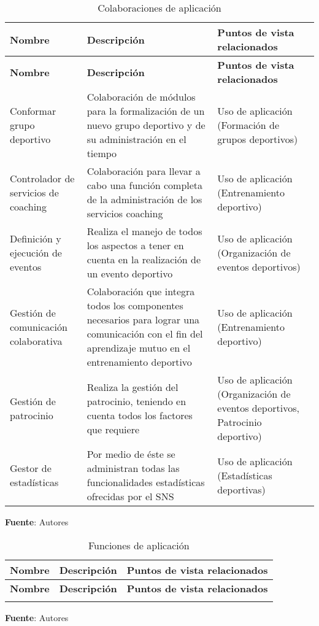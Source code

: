 \begin{center}
	\begin{longtable}{|p{4cm}|p{7cm}|p{4cm}|}
		\caption{Colaboraciones de aplicación \label{tab:colaboraciones_aplicacion}} \\
		\hline
		\textbf{Nombre} &
		\textbf{Descripción} &
		\textbf{Puntos de vista relacionados} \\
		\hline
		\endfirsthead
		\hline
		\textbf{Nombre} &
		\textbf{Descripción} &
		\textbf{Puntos de vista relacionados} \\
		\hline
		\endhead
		\hline
		\endfoot
		\hline
		\endlastfoot
					Conformar grupo deportivo & 
			Colaboración de módulos para la formalización de un nuevo grupo deportivo y de su administración en el tiempo & 
			Uso de aplicación (Formación de grupos deportivos)
			\\
			\hline
			Controlador de servicios de coaching & 
			Colaboración para llevar a cabo una función completa de la administración de los servicios coaching & 
			Uso de aplicación (Entrenamiento deportivo)
			\\
			\hline
			Definición y ejecución de eventos & 
			Realiza el manejo de todos los aspectos a tener en cuenta en la realización de un evento deportivo & 
			Uso de aplicación (Organización de eventos deportivos)
			\\
			\hline
			Gestión de comunicación colaborativa & 
			Colaboración que integra todos los componentes necesarios para lograr una comunicación con el fin del aprendizaje mutuo en el entrenamiento deportivo & 
			Uso de aplicación (Entrenamiento deportivo)
			\\
			\hline
			Gestión de patrocinio & 
			Realiza la gestión del patrocinio, teniendo en cuenta todos los factores que requiere & 
			Uso de aplicación (Organización de eventos deportivos, Patrocinio deportivo)
			\\
			\hline
			Gestor de estadísticas & 
			Por medio de éste se administran todas las funcionalidades estadísticas ofrecidas por el SNS & 
			Uso de aplicación (Estadísticas deportivas)
			\\
			\hline
	\end{longtable}
	\textbf{Fuente}: Autores
\end{center}

\begin{center}
	\begin{longtable}{|p{4cm}|p{7cm}|p{4cm}|}
		\caption{Funciones de aplicación \label{tab:funciones_aplicacion}} \\
		\hline
		\textbf{Nombre} &
		\textbf{Descripción} &
		\textbf{Puntos de vista relacionados} \\
		\hline
		\endfirsthead
		\hline
		\textbf{Nombre} &
		\textbf{Descripción} &
		\textbf{Puntos de vista relacionados} \\
		\hline
		\endhead
		\hline
		\endfoot
		\hline
		\endlastfoot
	\end{longtable}
	\textbf{Fuente}: Autores
\end{center}

